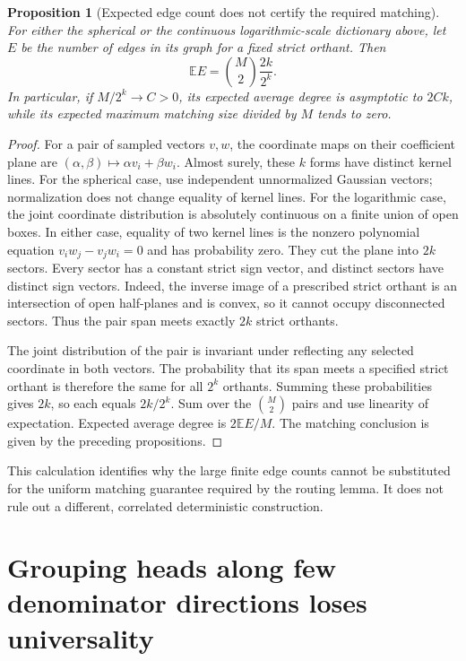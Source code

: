\documentclass[11pt]{article}
\newtheorem{proposition}{Proposition}
\begin{document}
\begin{proposition}[Expected edge count does not certify the required matching]
For either the spherical or the continuous logarithmic-scale dictionary
above, let $E$ be the number of edges in its graph for a fixed strict
orthant. Then
\[
 \mathbb E E=\binom M2\frac{2k}{2^k}.
\]
In particular, if $M/2^k\longrightarrow C>0$, its expected average
degree is asymptotic to $2Ck$, while its expected maximum matching
size divided by $M$ tends to zero.
\end{proposition}
\begin{proof}
For a pair of sampled vectors $v,w$, the coordinate maps on their
coefficient plane are $(\alpha,\beta)\mapsto\alpha v_i+\beta w_i$.
Almost surely, these $k$ forms have distinct kernel lines. For the
spherical case, use independent unnormalized Gaussian vectors;
normalization does not change equality of kernel lines. For the
logarithmic case, the joint coordinate distribution is absolutely
continuous on a finite union of open boxes. In either case, equality
of two kernel lines is the nonzero polynomial equation
$v_iw_j-v_jw_i=0$ and has probability zero. They cut the plane
into $2k$ sectors. Every sector has a constant strict sign vector,
and distinct sectors have distinct sign vectors. Indeed, the inverse
image of a prescribed strict orthant is an intersection of open
half-planes and is convex, so it cannot occupy disconnected sectors.
Thus the pair span meets exactly $2k$ strict orthants.

The joint distribution of the pair is invariant under reflecting any
selected coordinate in both vectors. The probability that its span
meets a specified strict orthant is therefore the same for all $2^k$
orthants. Summing these probabilities gives $2k$, so each equals
$2k/2^k$. Sum over the $\binom M2$ pairs and use linearity of
expectation. Expected average degree is $2\mathbb E E/M$.
The matching conclusion is given by the preceding propositions.
\end{proof}

This calculation identifies why the large finite edge counts cannot
be substituted for the uniform matching guarantee required by the
routing lemma. It does not rule out a different, correlated deterministic
construction.

\section{Grouping heads along few denominator directions loses universality}
\end{document}
